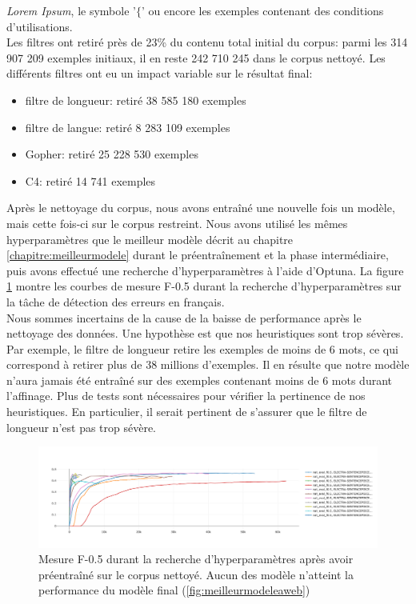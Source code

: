 \documentclass[12pt,twoside,rapport]{dms}
\theoremstyle{definition}
\numberwithin{equation}{section}
\numberwithin{table}{chapter}
\numberwithin{figure}{chapter}
\begin{document}
\textit{Lorem Ipsum}, le symbole '$\{$'  ou encore les exemples contenant des
conditions d'utilisations.\\ Les filtres ont retiré près de 23\% du contenu
total initial du corpus: parmi les 314 907 209 exemples initiaux, il en reste 242
710 245 dans le corpus nettoyé. Les différents filtres ont eu un impact
variable sur le résultat final:
\begin{itemize}
	\item filtre de longueur: retiré 38 585 180 exemples
	\item filtre de langue: retiré 8 283 109 exemples
	\item Gopher: retiré 25 228 530 exemples
	\item C4: retiré 14 741 exemples
\end{itemize}
Après le nettoyage du corpus, nous avons entraîné une nouvelle fois un modèle,
mais cette fois-ci sur le corpus restreint. Nous avons utilisé les mêmes
hyperparamètres que le meilleur modèle décrit au chapitre
\ref{chapitre:meilleurmodele} durant le préentraînement et la phase
intermédiaire, puis avons effectué une recherche d'hyperparamètres à l'aide
d'Optuna. La figure \ref{fig:electrapropre} montre les courbes de mesure F-0.5
durant la recherche d'hyperparamètres sur la tâche de détection des erreurs en
français.\\

Nous sommes incertains de la cause de la baisse de performance après le
nettoyage des données. Une hypothèse est que nos heuristiques sont trop
sévères. Par exemple, le filtre de longueur retire les exemples de moins de 6
mots, ce qui correspond à retirer plus de 38 millions d'exemples. Il en résulte
que notre modèle n'aura jamais été entraîné sur des exemples contenant moins de
6 mots durant l'affinage.  Plus de tests sont nécessaires pour vérifier la
pertinence de nos heuristiques. En particulier, il serait pertinent de
s'assurer que le filtre de longueur n'est pas trop sévère.

\begin{figure}
	\begin{center}
		\includegraphics[width=1.0\textwidth]{figures/electrasentenecepicepropreoptunaf05.png}
	\end{center}
	\caption{Mesure F-0.5 durant la recherche d'hyperparamètres après avoir
		préentraîné sur le corpus nettoyé. Aucun des modèle n'atteint la
		performance du modèle final (\ref{fig:meilleurmodeleaweb})}
	\label{fig:electrapropre}
\end{figure}
\end{document}

